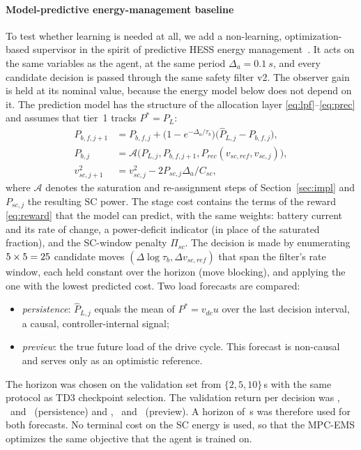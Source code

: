 \paragraph{Model-predictive energy-management baseline}
To test whether learning is needed at all, we add a non-learning, optimization-based supervisor in the spirit of predictive HESS energy management~\cite{ha2026hmpc,ha2026agsp}. It acts on the same variables as the agent, at the same period $\Delta_a=\SI{0.1}{s}$, and every candidate decision is passed through the same safety filter v2. The observer gain is held at its nominal value, because the energy model below does not depend on it. The prediction model has the structure of the allocation layer \eqref{eq:lpf}--\eqref{eq:prec} and assumes that tier~1 tracks $P^*=P_L$:
\begin{align}
P_{b,f,j+1}&=P_{b,f,j}+\big(1-e^{-\Delta_a/\tau_b}\big)\big(\hat P_{L,j}-P_{b,f,j}\big),\nonumber\\
P_{b,j}&=\mathcal{A}\big(\hat P_{L,j},P_{b,f,j+1},P_{rec}(v_{sc,ref},v_{sc,j})\big),\nonumber\\
v_{sc,j+1}^2&=v_{sc,j}^2-2P_{sc,j}\Delta_a/C_{sc},\label{eq:mpcems}
\end{align}
where $\mathcal{A}$ denotes the saturation and re-assignment steps of Section~\ref{sec:impl} and $P_{sc,j}$ the resulting SC power. The stage cost contains the terms of the reward \eqref{eq:reward} that the model can predict, with the same weights: battery current and its rate of change, a power-deficit indicator (in place of the saturated fraction), and the SC-window penalty $\Pi_{sc}$. The decision is made by enumerating $5\times5=25$ candidate moves $(\Delta\log\tau_b,\Delta v_{sc,ref})$ that span the filter's rate window, each held constant over the horizon (move blocking), and applying the one with the lowest predicted cost. Two load forecasts are compared:
\begin{itemize}
\item \emph{persistence}: $\hat P_{L,j}$ equals the mean of $P^*=v_{dc}u$ over the last decision interval, a causal, controller-internal signal;
\item \emph{preview}: the true future load of the drive cycle. This forecast is non-causal and serves only as an optimistic reference.
\end{itemize}
The horizon was chosen on the validation set from $\{2,5,10\}$\,s with the same protocol as TD3 checkpoint selection. The validation return per decision was \ValMPCPTwo, \ValMPCPFive\ and \ValMPCPTen\ (persistence) and \ValMPCVTwo, \ValMPCVFive\ and \ValMPCVTen\ (preview). A horizon of \HorMPCP\,s was therefore used for both forecasts. No terminal cost on the SC energy is used, so that the MPC-EMS optimizes the same objective that the agent is trained on.

